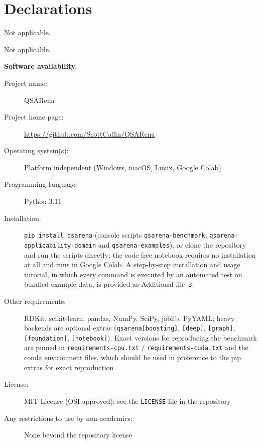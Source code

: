 \section*{Declarations}

Not applicable.

Not applicable.

\textbf{Software availability.}
\begin{description}
\item[Project name:] QSARena
\item[Project home page:] \url{https://github.com/ScottCoffin/QSARena}
\item[Operating system(s):] Platform independent (Windows, macOS, Linux, Google Colab)
\item[Programming language:] Python 3.11
\item[Installation:] \texttt{pip install qsarena} (console scripts \texttt{qsarena-benchmark}, \texttt{qsarena-applicability-domain} and \texttt{qsarena-examples}), or clone the repository and run the scripts directly; the code-free notebook requires no installation at all and runs in Google Colab. A step-by-step installation and usage tutorial, in which every command is executed by an automated test on bundled example data, is provided as Additional file~2
\item[Other requirements:] RDKit, scikit-learn, pandas, NumPy, SciPy, joblib, PyYAML; heavy backends are optional extras (\texttt{qsarena[boosting]}, \texttt{[deep]}, \texttt{[graph]}, \texttt{[foundation]}, \texttt{[notebook]}). Exact versions for reproducing the benchmark are pinned in \texttt{requirements-cpu.txt} / \texttt{requirements-cuda.txt} and the conda environment files, which should be used in preference to the pip extras for exact reproduction
\item[License:] MIT License (OSI-approved); see the \texttt{LICENSE} file in the repository
\item[Any restrictions to use by non-academics:] None beyond the repository license
\end{description}

